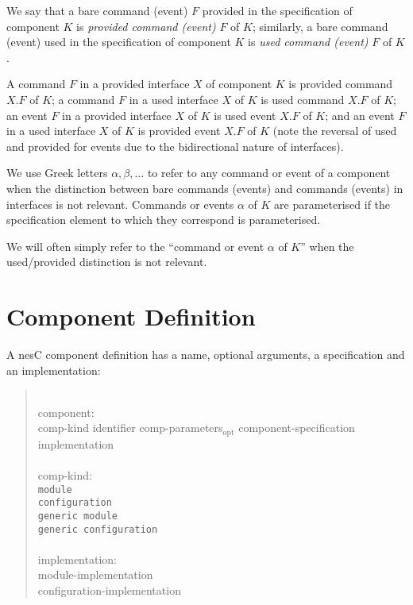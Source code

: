\documentclass[11pt,letterpaper]{article}
\newcommand{\kw}[1]{{\tt #1}}
\newcommand{\nesc}{nesC\xspace}
\newcommand{\opt}{$_{\mbox{opt}}$\xspace}
\newcommand{\grammarshift}{\vspace*{-.7cm}}
\newcommand{\grammarindent}{\hspace*{2cm}\= \\ \kill}
\begin{document}
We say that a bare command (event) $F$ provided in the specification of
component $K$ is \emph{provided command (event)} $F$ of $K$; similarly, a
bare command (event) used in the specification of component $K$ is
\emph{used command (event)} $F$ of $K$.

A command $F$ in a provided interface $X$ of component $K$ is
provided command $X.F$ of $K$; a command $F$ in a used interface
$X$ of $K$ is used command $X.F$ of $K$; an event $F$ in a provided
interface $X$ of $K$ is used event $X.F$ of $K$; and an event $F$
in a used interface $X$ of $K$ is provided event $X.F$ of $K$
(note the reversal of used and provided for events due to the bidirectional
nature of interfaces). 

We use Greek letters $\alpha, \beta, \ldots$ to refer to any command or
event of a component when the distinction between bare commands (events)
and commands (events) in interfaces is not relevant. Commands or events
$\alpha$ of $K$ are parameterised if the specification element to which they
correspond is parameterised.

We will often simply refer to the ``command or event $\alpha$ of $K$'' when
the used/provided distinction is not relevant.

\section{Component Definition}
\label{sec:component}

A \nesc component definition has a name, optional arguments, a
specification and an implementation:
\begin{quote} \grammarshift \em \begin{tabbing}
\grammarindent
component:\\
\>	comp-kind identifier comp-parameters\opt component-specification implementation\\
\\
comp-kind:\\
\>	\kw{module}\\
\>	\kw{configuration}\\
\>	\kw{generic module}\\
\>	\kw{generic configuration}\\
\\
implementation:\\
\>	module-implementation\\
\>	configuration-implementation
\end{tabbing} \end{quote}
\end{document}
